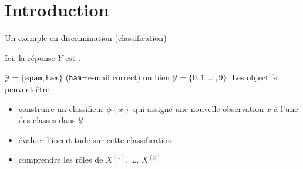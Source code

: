 \documentclass[unknownkeysallowed]{beamer}
\begin{document}
\section{Introduction}
\label{sec:introdcution}



\begin{frame}{Un exemple en discrimination (classification)}

      Ici, la réponse $Y$ est .

      \exemple
      $\mathcal{Y} = \{\texttt{spam},  \texttt{ham}\}$
      (\texttt{ham}=e-mail correct) ou bien
      $\mathcal{Y}= \{0, 1, \dots,9\}$. Les objectifs peuvent être
      \begin{itemize}
      \item construire un classifieur $\phi(x)$ qui assigne une nouvelle
        observation $x$ à l'une des classes dans $\mathcal{Y}$
      \item évaluer l'incertitude sur cette classification 
      \item comprendre les rôles de $X^{(1)}$, \dots, $X^{(p)}$
      \end{itemize}

\end{frame}
\end{document}

